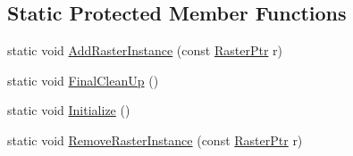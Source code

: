 \subsection*{Static Protected Member Functions}
\begin{DoxyCompactItemize}
\item 
static void \hyperlink{class_k_k_b_1_1_raster_aa6abf9e1a0c1c684b8ea94ce9bc77918}{Add\+Raster\+Instance} (const \hyperlink{class_k_k_b_1_1_raster_aefa532857fd6aa9eb53f79da55a97c5a}{Raster\+Ptr} r)
\item 
static void \hyperlink{class_k_k_b_1_1_raster_aaea50416d1a465c2bd46351c1229fecb}{Final\+Clean\+Up} ()
\item 
static void \hyperlink{class_k_k_b_1_1_raster_ae26204a81a54b533b562a8bb8044a397}{Initialize} ()
\item 
static void \hyperlink{class_k_k_b_1_1_raster_a08a471ab2ba9036fd5c21f07a1e67fe8}{Remove\+Raster\+Instance} (const \hyperlink{class_k_k_b_1_1_raster_aefa532857fd6aa9eb53f79da55a97c5a}{Raster\+Ptr} r)
\end{DoxyCompactItemize}
